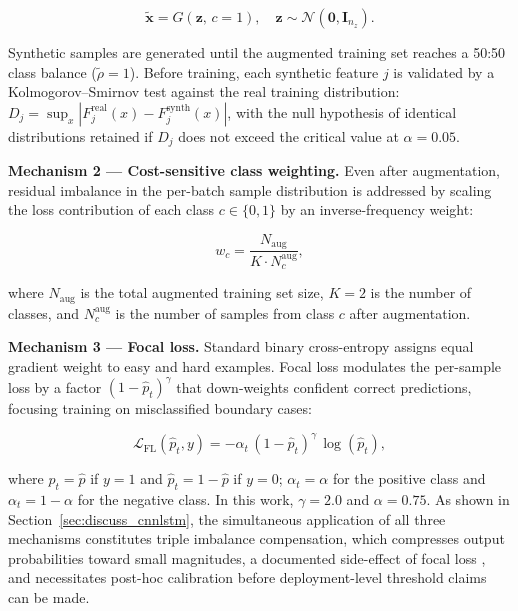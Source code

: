 \documentclass[sensors,article,submit,pdftex,moreauthors]{Definitions/mdpi}
\begin{document}
\begin{linenomath}
\begin{equation}
\tilde{\mathbf{x}} = G(\mathbf{z},\, c{=}1),
\quad \mathbf{z} \sim \mathcal{N}(\mathbf{0}, \mathbf{I}_{n_z}).
\label{eq:ctgan}
\end{equation}
\end{linenomath}

\noindent Synthetic samples are generated until the augmented
training set reaches a 50:50 class balance
($\tilde{\rho} = 1$).
Before training, each synthetic feature $j$ is validated by a
Kolmogorov--Smirnov test against the real training distribution:
$D_j = \sup_x|F_j^{\text{real}}(x) - F_j^{\text{synth}}(x)|$,
with the null hypothesis of identical distributions retained if
$D_j$ does not exceed the critical value at $\alpha = 0.05$.

\textbf{Mechanism 2 — Cost-sensitive class weighting.}
Even after augmentation, residual imbalance in the per-batch sample
distribution is addressed by scaling the loss contribution of each
class $c \in \{0,1\}$ by an inverse-frequency weight:

\begin{linenomath}
\begin{equation}
w_c = \frac{N_\text{aug}}{K \cdot N_c^{\text{aug}}},
\label{eq:classweight}
\end{equation}
\end{linenomath}

\noindent where $N_\text{aug}$ is the total augmented training set
size, $K = 2$ is the number of classes, and $N_c^{\text{aug}}$ is
the number of samples from class $c$ after augmentation.

\textbf{Mechanism 3 — Focal loss.}
Standard binary cross-entropy assigns equal gradient weight to easy
and hard examples.
Focal loss \citep{ref-focal-loss} modulates the per-sample loss by a
factor $(1-\hat{p}_t)^\gamma$ that down-weights confident correct
predictions, focusing training on misclassified boundary cases:

\begin{linenomath}
\begin{equation}
\mathcal{L}_\text{FL}(\hat{p}_t, y) =
  -\alpha_t\,(1-\hat{p}_t)^{\gamma}\,\log(\hat{p}_t),
\label{eq:focal}
\end{equation}
\end{linenomath}

\noindent where $\hat{p}_t = \hat{p}$ if $y = 1$ and
$\hat{p}_t = 1 - \hat{p}$ if $y = 0$;
$\alpha_t = \alpha$ for the positive class and
$\alpha_t = 1 - \alpha$ for the negative class.
In this work, $\gamma = 2.0$ and $\alpha = 0.75$.
As shown in Section~\ref{sec:discuss_cnnlstm}, the simultaneous
application of all three mechanisms constitutes triple imbalance
compensation, which compresses output probabilities toward small
magnitudes, a documented side-effect of focal loss
\citep{ref-calibration-focal2020}, and necessitates post-hoc
calibration before deployment-level threshold claims can be made.
\end{document}
